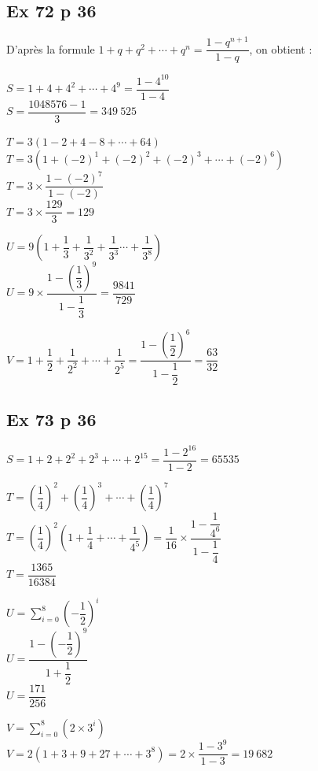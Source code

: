 \documentclass[a4paper,french]{book}
\begin{document}
\subsection*{Ex 72 p 36}
D'après la formule $1+q+q^{2}+\cdots+q^{n}=\dfrac{1-q^{n+1}}{1-q}$, on obtient :
\begin{enumMet}
    \item $S=1+4+4^{2}+\cdots+4^{9}=\dfrac{1-4^{10}}{1-4}$\\
    $S=\dfrac{1048576-1}{3}=349\ 525$
    \item $T=3(1-2+4-8+\cdots+64)$\\
    $T=3\left(1+(-2)^{1}+(-2)^{2}+(-2)^{3}+\cdots+(-2)^{6}\right)$\\
    $T=3 \times \dfrac{1-(-2)^{7}}{1-(-2)}$\\
    $T=3 \times \dfrac{129}{3}=129$
    \item $U=9\left(1+\dfrac{1}{3}+\dfrac{1}{3^{2}}+\dfrac{1}{3^{3}} \cdots+\dfrac{1}{3^{8}}\right)$\\
    $U=9 \times \dfrac{1-\left(\dfrac{1}{3}\right)^{9}}{1-\dfrac{1}{3}}=\dfrac{9841}{729}$
    \item $V=1+\dfrac{1}{2}+\dfrac{1}{2^{2}}+\cdots+\dfrac{1}{2^{5}}=\dfrac{1-\left(\dfrac{1}{2}\right)^{6}}{1-\dfrac{1}{2}}=\dfrac{63}{32}$
\end{enumMet}

\subsection*{Ex 73 p 36}
\begin{enumMet}
    \item 
    \begin{enumMet}
        \item $S=1+2+2^{2}+2^{3}+\cdots+2^{15}=\dfrac{1-2^{16}}{1-2}=65535$
        \item $T=\left(\dfrac{1}{4}\right)^{2}+\left(\dfrac{1}{4}\right)^{3}+\cdots+\left(\dfrac{1}{4}\right)^{7}$\\
        $T=\left(\dfrac{1}{4}\right)^{2}\left(1+\dfrac{1}{4}+\cdots+\dfrac{1}{4^{5}}\right)=\dfrac{1}{16} \times \dfrac{1-\dfrac{1}{4^{6}}}{1-\dfrac{1}{4}}$\\
        $T=\dfrac{1365}{16384}$
    \end{enumMet}
    \item
    \begin{enumMet}
        \item $U=\sum \limits_{i=0}^{8}\left(-\dfrac{1}{2}\right)^{i}$\\
        $U=\dfrac{1-\left(-\dfrac{1}{2}\right)^{9}}{1+\dfrac{1}{2}}$\\
        $U =\dfrac{171}{256}$
        \item $V=\sum_{i=0}^{8}\left(2 \times 3^{i}\right)$\\
        $V=2\left(1+3+9+27+\cdots+3^{8}\right)=2 \times \dfrac{1-3^{9}}{1-3}=19\ 682$
    \end{enumMet}
\end{enumMet}
\end{document}
